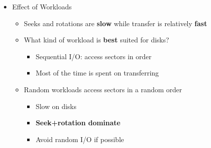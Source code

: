 \documentclass[a4paper,11pt,english]{article}
\begin{document}
\begin{itemize}
\begin{itemize}
\[                \]
        \end{itemize}
    \item Effect of Workloads
        \begin{itemize}
            \item Seeks and rotations are \textbf{\color{red} slow} while transfer is relatively \textbf{\color{blue} fast} 
            \item What kind of workload is \textbf{\color{blue} best} suited for disks?
                \begin{itemize}
                    \item Sequential I/O: access sectors in order 
                    \item Most of the time is spent on transferring
                \end{itemize}
            \item Random workloads access sectors in a random order
                \begin{itemize}
                    \item Slow on disks
                    \item \textbf{\color{blue} Seek+rotation dominate}
                    \item Avoid random I/O if possible
                \end{itemize}
        \end{itemize}
\end{itemize}
\end{document}
